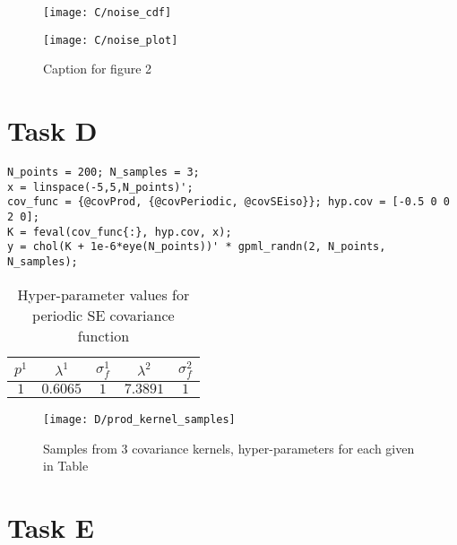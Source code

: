 \documentclass[11pt]{article}
\begin{document}
\begin{figure}[ht]
    \centering
    \begin{minipage}{0.5\textwidth}
        \centering
        \texttt{[image: C/noise\_cdf]} %
    \end{minipage}%
    \begin{minipage}{0.5\textwidth}
        \centering
        \texttt{[image: C/noise\_plot]} %
    \end{minipage}
    \caption{Caption for figure 2}
    \label{fig:C_noise_distribution}
\end{figure}

\section{Task D}

\begin{lstlisting}[caption=Code to sample a GP with covariance defined by the product of a periodic SE kernel and a SE kernel, captionpos=b, basicstyle=\small]
N_points = 200; N_samples = 3;
x = linspace(-5,5,N_points)';
cov_func = {@covProd, {@covPeriodic, @covSEiso}}; hyp.cov = [-0.5 0 0 2 0];
K = feval(cov_func{:}, hyp.cov, x);
y = chol(K + 1e-6*eye(N_points))' * gpml_randn(2, N_points, N_samples);
\end{lstlisting}
\label{lst:2D}


\begin{table}[h]
    \centering
    \begin{tabular}{|c|c|c|c|c|}
        \hline
        $p^1$ & $\lambda^1$ & $\sigma_f^1$ & $\lambda^2$ & $\sigma_f^2$ \\
        \hline
        $1$ & $0.6065$ & $1$ & $7.3891$ & $1$ \\
        \hline
    \end{tabular}
    \caption{Hyper-parameter values for periodic SE covariance function}
    \label{table:D_product_covariance_hyper_parameters}
\end{table}

\begin{figure}[h]
    \centering
    \texttt{[image: D/prod\_kernel\_samples]}
    \caption{Samples from 3 covariance kernels, hyper-parameters for each given in Table}
    \label{fig:D_prod_kernel_samples}
\end{figure}

\section{Task E}
\end{document}
